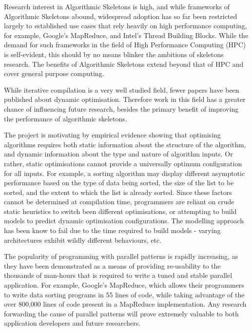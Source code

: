 Research interest in Algorithmic Skeletons is high, and while
frameworks of Algorithmic Skeletons abound, widespread adoption has so
far been restricted largely to established use cases that rely heavily
on high performance computing, for example, Google's MapReduce, and
Intel's Thread Building Blocks. While the demand for such frameworks
in the field of High Performance Computing (HPC) is self-evident, this
should by no means blinker the ambitions of skeletons research. The
benefits of Algorithmic Skeletons extend beyond that of HPC and cover
general purpose computing.



While iterative compilation is a very well studied field, fewer papers
have been published about dynamic optimisation. Therefore work in this
field has a greater chance of influencing future research, besides the
primary benefit of improving the performance of algorithmic skeletons.

The project is motivating by empirical evidence showing that
optimising algorithms requires both static information about the
structure of the algorithm, and dynamic information about the type and
nature of algorithm inputs. Or rather, static optimisations cannot
provide a universally optimum configuration for all inputs. For
example, a sorting algorithm may display different asymptotic
performance based on the type of data being sorted, the size of the
list to be sorted, and the extent to which the list is already
sorted. Since these factors cannot be determined at compilation time,
programmers are reliant on crude static heuristics to switch been
different optimisations, or attempting to build models to predict
dynamic optimisation configurations. The modelling approach has been
know to fail due to the time required to build models - varying
architectures exhibit wildly different behaviours, etc.



The popularity of programming with parallel patterns is rapidly
increasing, as they have been demonstrated as a means of providing
re-usability to the thousands of man-hours that is required to write a
tuned and stable parallel application. For example, Google's
MapReduce, which allows their programmers to write data sorting
programs in 55 lines of code, while taking advantage of the over
800,000 lines of code present in a MapReduce implementation. Any
research forwarding the cause of parallel patterns will prove
extremely valuable to both application developers and future
researchers.


